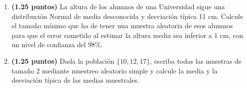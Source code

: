 
\begin{enumerate}[label=\alph*)]
\item \textbf{(1.25 puntos)} La altura de los alumnos de una Universidad sigue una distribución Normal de media desconocida y desviación típica 11 cm. Calcule el tamaño mínimo que ha de tener una muestra aleatoria de esos alumnos para que el error cometido al estimar la altura media sea inferior a 1 cm, con un nivel de confianza del $98\%$.
\item \textbf{(1.25 puntos)} Dada la población $\{10,12,17\}$, escriba todas las muestras de tamaño 2 mediante muestreo aleatorio simple y calcule la media y la desviación típica de las medias muestrales.
\end{enumerate}
